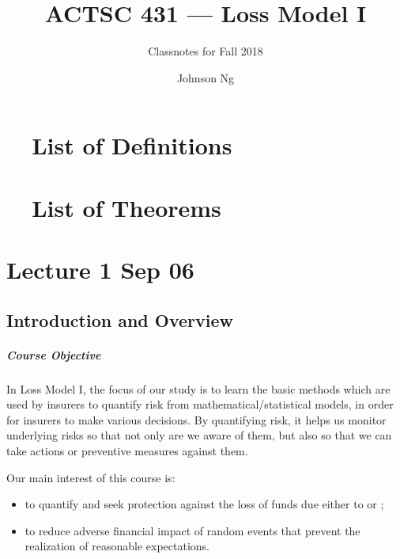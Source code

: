 \documentclass[notoc,notitlepage]{tufte-book}
\title{ACTSC 431 --- Loss Model I}
\author{Johnson Ng}
\subtitle{Classnotes for Fall 2018}
\begin{document}
\hypersetup{pageanchor=false}
\maketitle
\hypersetup{pageanchor=true}
\tableofcontents

\chapter*{\faBook\ \enspace\ List of Definitions}
\begin{fullwidth}
\end{fullwidth}

\chapter*{\faCoffee\ \enspace\ List of Theorems}
\begin{fullwidth}
\end{fullwidth}

\chapter{Lecture 1 Sep 06}%
\label{chp:lecture_1_sep_06}

\section{Introduction and Overview}%
\label{sec:introduction_and_overview}

\paragraph{Course Objective} In Loss Model I, the focus of our study is to learn the basic methods which are used by insurers to quantify risk from mathematical/statistical models, in order for insurers to make various decisions. By quantifying risk, it helps us monitor underlying risks so that not only are we aware of them, but also so that we can take actions or preventive measures against them.

Our main interest of this course is:
\begin{itemize}
  \item to quantify and seek protection against the loss of funds due either to  or ;
  \item to reduce adverse financial impact of random events that prevent the realization of reasonable expectations.
\end{itemize}
\end{document}

